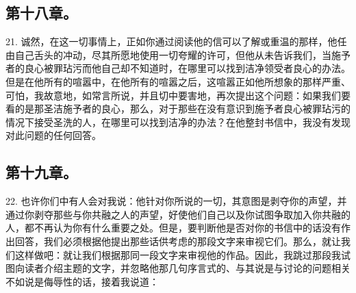 
\subsection{第十八章。}

21. 诚然，在这一切事情上，正如你通过阅读他的信可以了解或重温的那样，他任由自己舌头的冲动，尽其所愿地使用一切夸耀的许可，但他从未告诉我们，当施予者的良心被罪玷污而他自己却不知道时，在哪里可以找到洁净领受者良心的办法。但是在他所有的喧嚣中，在他所有的喧嚣之后，这喧嚣正如他所想象的那样严重、可怕，我故意地，如常言所说，并且切中要害地，再次提出这个问题：如果我们要看的是那圣洁施予者的良心，那么，对于那些在没有意识到施予者良心被罪玷污的情况下接受圣洗的人，在哪里可以找到洁净的办法？在他整封书信中，我没有发现对此问题的任何回答。\par


\subsection{第十九章。}

22. 也许你们中有人会对我说：他针对你所说的一切，其意图是剥夺你的声望，并通过你剥夺那些与你共融之人的声望，好使他们自己以及你试图争取加入你共融的人，都不再认为你有什么重要之处。但是，要判断他是否对你的书信中的话没有作出回答，我们必须根据他提出那些话供考虑的那段文字来审视它们。那么，就让我们这样做吧：就让我们根据那同一段文字来审视他的作品。因此，我跳过那段我试图向读者介绍主题的文字，并忽略他那几句序言式的、与其说是与讨论的问题相关不如说是侮辱性的话，接着我说道：\par


